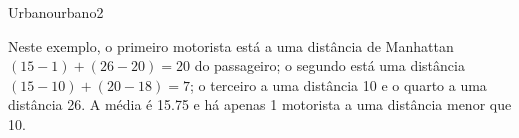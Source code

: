 \documentclass[12pt,a4paper,oneside]{article}
\begin{document}
\begin{problem}{Urbano}{urbano}{2}
\Example

\begin{example}
%
\end{example}

Neste exemplo, o primeiro motorista está a uma distância de Manhattan $(15-1) + (26-20) = 20$ do passageiro; o segundo está uma distância $(15-10) + (20-18) = 7$; o terceiro a uma distância 10 e o quarto a uma distância 26. A média é 15.75 e há apenas 1 motorista a uma distância menor que 10.

\begin{example}
%
\end{example}

\begin{example}
%
\end{example}



\end{problem}
\end{document}
